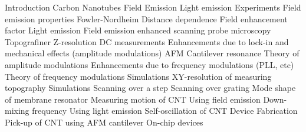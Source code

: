 

\begin{outline}[enumerate]
    \1 Introduction
         \2 Carbon Nanotubes
         \2 Field Emission
            \3 Light emission
        \2 Experiments
    \1 Field emission properties
        \2 Fowler-Nordheim
        \2 Distance dependence
        \2 Field enhancement factor
        \2 Light emission
    \1 Field emission enhanced scanning probe microscopy
        \2 Topografiner
        \2 Z-resolution
            \3 DC measurements
            \3 Enhancements due to lock-in and mechanical effects (amplitude modulations)
                \4 AFM Cantilever resonance
                \4 Theory of amplitude modulations
            \3 Enhancements due to frequency modulations (PLL, etc)
                \4 Theory of frequency modulations
                \4 Simulations
        \2 XY-resolution of measuring topography
            \3 Simulations
            \3 Scanning over a step
            \3 Scanning over grating
        \2 Mode shape of membrane resonator
    \1 Measuring motion of CNT
        \2 Using field emission
            \3 Down-mixing frequency
        \2 Using light emission
        \2 Self-oscillation of CNT
    \1 Device Fabrication
        \2 Pick-up of CNT using AFM cantilever
        \2 On-chip devices
\end{outline}